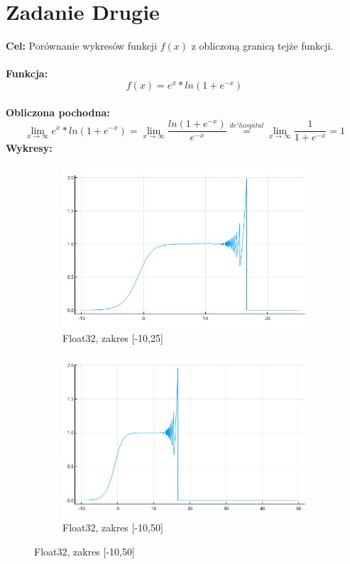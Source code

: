 \documentclass{article}
\begin{document}
\section*{Zadanie Drugie}
\noindent \textbf{Cel: } Porównanie wykresów funkcji $f(x)$ z obliczoną granicą tejże funkcji.\\\\
\noindent \textbf{Funkcja: } 
$$ f(x) = e^{x}*ln(1+e^{-x}) $$\\
\noindent \textbf{Obliczona pochodna: }
$$\lim_{x \to \infty} e^{x}*ln(1+e^{-x}) = \lim_{x \to \infty} \frac{ln(1+e^{-x})}{e^{-x}}  \stackrel{de'hospital}{=} \lim_{x \to \infty} \frac{1}{1+e^{-x}} = 1  $$
\noindent \textbf{Wykresy: }
\begin{figure}[ht]
	\begin{subfigure}{.5\textwidth}
	\centering
	\includegraphics[width=.8\linewidth]{JuliaPlots/Float32(-10-25)}  
	\caption*{Float32, zakres [-10,25]}

\end{subfigure}
\begin{subfigure}{.5\textwidth}
	\centering
	\includegraphics[width=.8\linewidth]{JuliaPlots/Float32(-10-50)}  
	\caption*{Float32, zakres [-10,50]}

	\end{subfigure}
\end{figure}
\end{document}
